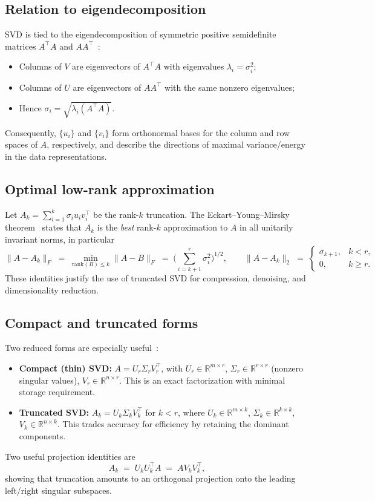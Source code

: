 \documentclass[11pt,a4paper]{article}
\begin{document}
\subsection{Relation to eigendecomposition}
SVD is tied to the eigendecomposition of symmetric positive semidefinite matrices \(A^\top A\) and \(A A^\top\)~\cite{golub2013matrix,horn2012matrix}:
\begin{itemize}
    \item Columns of \(V\) are eigenvectors of \(A^\top A\) with eigenvalues \(\lambda_i = \sigma_i^2\);
    \item Columns of \(U\) are eigenvectors of \(A A^\top\) with the same nonzero eigenvalues;
    \item Hence \(\sigma_i = \sqrt{\lambda_i(A^\top A)}\).
\end{itemize}
Consequently, \(\{u_i\}\) and \(\{v_i\}\) form orthonormal bases for the column and row spaces of \(A\), respectively, and describe the directions of maximal variance/energy in the data representations.

\subsection{Optimal low-rank approximation}
Let \(A_k = \sum_{i=1}^{k} \sigma_i u_i v_i^\top\) be the rank-\(k\) truncation. 
The Eckart--Young--Mirsky theorem~\cite{eckart1936approximation,mirsky1960symmetric} states that \(A_k\) is the \emph{best} rank-\(k\) approximation to \(A\) in all unitarily invariant norms, in particular
\[
\|A - A_k\|_F \;=\; \min_{\mathrm{rank}(B)\le k} \|A-B\|_F \;=\; \Big(\sum_{i=k+1}^{r} \sigma_i^2\Big)^{\!1/2}, 
\qquad
\|A - A_k\|_2 \;=\; 
\begin{cases}
\sigma_{k+1}, & k < r,\\[2pt]
0, & k \ge r.
\end{cases}
\]
These identities justify the use of truncated SVD for compression, denoising, and dimensionality reduction.

\subsection{Compact and truncated forms}
Two reduced forms are especially useful~\cite{klema1980svd,golub2013matrix}:
\begin{itemize}
    \item \textbf{Compact (thin) SVD:} \(A = U_r \Sigma_r V_r^\top\), with \(U_r \in \mathbb{R}^{m \times r}\), \(\Sigma_r \in \mathbb{R}^{r \times r}\) (nonzero singular values), \(V_r \in \mathbb{R}^{n \times r}\). This is an exact factorization with minimal storage requirement.
    \item \textbf{Truncated SVD:} \(A_k = U_k \Sigma_k V_k^\top\) for \(k < r\), where \(U_k \in \mathbb{R}^{m \times k}\), \(\Sigma_k \in \mathbb{R}^{k \times k}\), \(V_k \in \mathbb{R}^{n \times k}\). This trades accuracy for efficiency by retaining the dominant components.
\end{itemize}
Two useful projection identities are
\[
A_k \;=\; U_k U_k^\top A \;=\; A V_k V_k^\top,
\]
showing that truncation amounts to an orthogonal projection onto the leading left/right singular subspaces.
\end{document}
